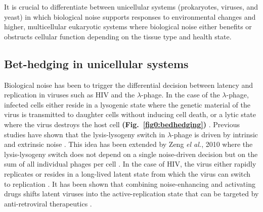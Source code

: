 \newpage

It is crucial to differentiate between unicellular systems (prokaryotes, viruses, and yeast) in which biological noise supports responses to environmental changes and higher, multicellular eukaryotic systems where biological noise either benefits or obstructs cellular function depending on the tissue type and health state. 

\subsection{Bet-hedging in unicellular systems}

Biological noise has been  to trigger the differential decision between latency and replication in viruses such as \gls{HIV} and the $\lambda$-phage. 
In the case of the $\lambda$-phage, infected cells either reside in a lysogenic state where the genetic material of the virus is transmitted to daughter cells without inducing cell death, or a lytic state where the virus destroys the host cell \textbf{(Fig.~\ref{fig0:bedhedging})} \citep{Lieb1953}. 
Previous studies have shown that the lysis-lysogeny switch in $\lambda$-phage is driven by intrinsic and extrinsic noise \citep{Arkin1998, St-Pierre2008}. 
This idea has been extended by Zeng \textit{el al.}, 2010 where the lysis-lysogeny switch does not depend on a single noise-driven decision but on the sum of all individual phages per cell \citep{Zeng2010}. 
In the case of \Gls{HIV}, the virus either rapidly replicates or resides in a long-lived latent state from which the virus can switch to replication \citep{Weinberger2015}. 
It has been shown that combining noise-enhancing and activating drugs shifts latent viruses into the active-replication state that can be targeted by anti-retroviral therapeutics \citep{Dar2014}. 

